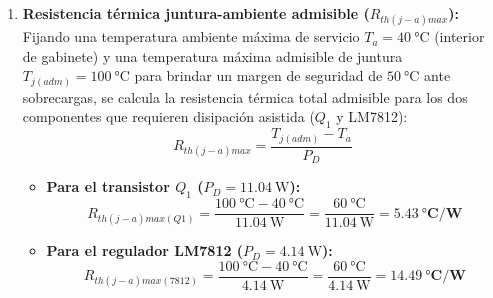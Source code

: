 \begin{enumerate}
\begin{itemize}
        \item \textbf{Regulador integrado LM7812 (LM7812K, TO-3):} Conducen $I_{out(7812)} = \SI{0.926}{\ampere}$
        con caída $V_{drop} \approx \SI{4.47}{\volt}$, disipando $P_{D(7812)} = \mathbf{\SI{4.14}{\watt}}$.
        Para el encapsulado metálico TO-3 ($R_{th(j-a)} \approx \SI{35}{\celsius/\watt}$) a $T_a = \SI{40}{\celsius}$:
        \begin{equation*}
            T_j = \SI{40}{\celsius} + \SI{4.14}{\watt} \cdot \SI{35}{\celsius/\watt} = \mathbf{\SI{184.9}{\celsius}}
        \end{equation*}
        (a $T_a = \SI{25}{\celsius}$, $T_j = \SI{169.9}{\celsius}$). Superando el límite de $\SI{150}{\celsius}$ y provocando
        la parada térmica por protección interna, \textbf{el LM7812 requiere obligatoriamente disipador térmico}.
    \end{itemize}
    
    \item \textbf{Resistencia térmica juntura-ambiente admisible ($R_{th(j-a)max}$):}  
    Fijando una temperatura ambiente máxima de servicio $T_a = \SI{40}{\celsius}$ (interior de gabinete) y una temperatura
    máxima admisible de juntura $T_{j(adm)} = \SI{100}{\celsius}$ para brindar un margen de seguridad de $\SI{50}{\celsius}$ ante sobrecargas, se calcula la resistencia térmica total
    admisible para los dos componentes que requieren disipación asistida ($Q_1$ y LM7812):
    \begin{equation*}
        R_{th(j-a)max} = \frac{T_{j(adm)} - T_a}{P_D}
    \end{equation*}
    \begin{itemize}
        \item \textbf{Para el transistor $Q_1$ ($P_D = \SI{11.04}{\watt}$):}
        \begin{equation*}
            R_{th(j-a)max(Q1)} = \frac{\SI{100}{\celsius} - \SI{40}{\celsius}}{\SI{11.04}{\watt}} = \frac{\SI{60}{\celsius}}{\SI{11.04}{\watt}} = \mathbf{\SI{5.43}{\celsius/\watt}}
        \end{equation*}
        
        \item \textbf{Para el regulador LM7812 ($P_D = \SI{4.14}{\watt}$):}
        \begin{equation*}
            R_{th(j-a)max(7812)} = \frac{\SI{100}{\celsius} - \SI{40}{\celsius}}{\SI{4.14}{\watt}} = \frac{\SI{60}{\celsius}}{\SI{4.14}{\watt}} = \mathbf{\SI{14.49}{\celsius/\watt}}
        \end{equation*}
    \end{itemize}
    

\end{enumerate}
